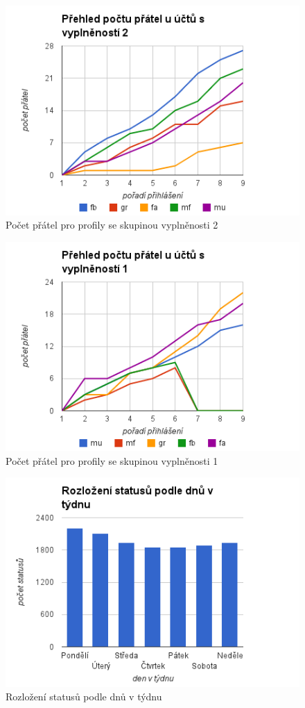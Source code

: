 \documentclass[thesis=M,czech]{FITthesis}[2013/05/10]
\begin{document}
\begin{figure}[h]
\includegraphics[width=5in]{figures/level2.png}
\caption{Počet přátel pro profily se skupinou vyplněnosti 2}
\label{fig:level2}
\end{figure}

\begin{figure}[h]
\includegraphics[width=5in]{figures/level1.png}
\caption{Počet přátel pro profily se skupinou vyplněnosti 1}
\label{fig:level1}
\end{figure}

\begin{figure}[h]
\includegraphics[width=5in]{figures/postedDays.png}
\caption{Rozložení statusů podle dnů v týdnu}
\label{fig:postedDays}
\end{figure}
\end{document}
